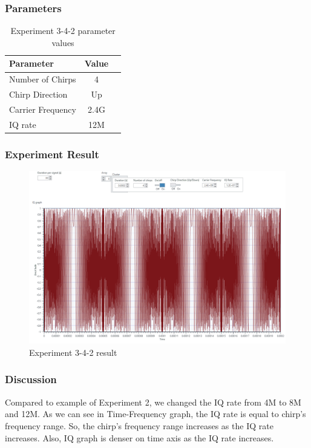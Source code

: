 \clearpage
    
    \subsubsection*{Parameters}
    \begin{table}[!h]\centering
        \hspace{10mm}
        \begin{tabular}{|l|c|c|}
        \hline
        \multicolumn{1}{|l|}{Parameter} & \multicolumn{1}{l|}{Value} \\
        \hline
        Number of Chirps & 4 \\ 
        \hline
        Chirp Direction & Up \\ 
        \hline
        Carrier Frequency & 2.4G \\ 
        \hline
        IQ rate & 12M \\ 
        \hline
        \end{tabular}
        \caption{Experiment 3-4-2 parameter values}
    \end{table}
    
    \subsubsection*{Experiment Result}
    \vspace{-4mm}  
    \begin{figure}[!h]\raggedleft
    \hspace{15mm}
		\includegraphics[width=.95\textwidth]{image/week03/3-4-2.png}
		\caption{\footnotesize Experiment 3-4-2 result}
		\vspace{-10pt}
    \end{figure}
    
    \subsubsection*{Discussion}
    Compared to example of Experiment 2, we changed the IQ rate from 4M to 8M and 12M. As we can see in Time-Frequency graph, the IQ rate is equal to chirp’s frequency range. So, the chirp’s frequency range increases as the IQ rate increases. Also, IQ graph is denser on time axis as the IQ rate increases. \\
\clearpage